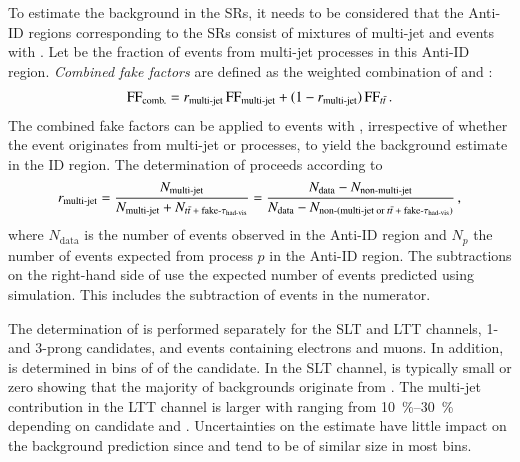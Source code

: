 To estimate the \faketauhadvis background in the SRs, it needs to be considered
that the Anti-ID regions corresponding to the SRs consist of mixtures of
multi-jet and \ttbar events with \faketauhadvis. Let \rqcd be the fraction of
\faketauhadvis events from multi-jet processes in this Anti-ID
region. \emph{Combined fake factors} are defined as the weighted combination of
\FFqcd and \FFttbar:
\begin{align*}
  \text{FF}_{\text{comb.}} = r_{\text{multi-jet}} \, \text{FF}_{\text{multi-jet}} + (1 - r_{\text{multi-jet}}) \, \text{FF}_{t\bar{t}} \,\text{.}
\end{align*}
The combined fake factors can be applied to events with \faketauhadvis,
irrespective of whether the event originates from multi-jet or \ttbar processes,
to yield the background estimate in the ID region. The determination of \rqcd
proceeds according to
\begin{align}
  \rqcd =
  \frac{N_{\text{multi-jet}}}{N_{\text{multi-jet}} + N_{\text{\ttbarFakes}}}
  = \frac
  { N_{\text{data}} - N_{\text{non-multi-jet}} }
  { N_{\text{data}} - N_{\text{non-(multi-jet or \ttbarFakes)}} } \,\text{,}
  \label{eq:rqcd}
\end{align}
where $N_{\text{data}}$ is the number of events observed in the Anti-ID region
and $N_{p}$ the number of events expected from process $p$ in the Anti-ID
region. The subtractions on the right-hand side of  use the
expected number of events predicted using simulation. This includes the
subtraction of \ttbarFakes events in the numerator.

The determination of \rqcd is performed separately for the \lephad SLT and LTT
channels, 1- and 3-prong \tauhadvis candidates, and events containing electrons
and muons. In addition, \rqcd is determined in bins of \pT of the \tauhadvis
candidate. In the SLT channel, \rqcd is typically small or zero showing that the
majority of \faketauhadvis backgrounds originate from \ttbar. The multi-jet
contribution in the LTT channel is larger with \rqcd ranging from
\SIrange{10}{30}{\percent} depending on \tauhadvis candidate \pT and
\Ntracks. Uncertainties on the \rqcd estimate have little impact on the
\faketauhadvis background prediction since \FFqcd and \FFttbar tend to be of
similar size in most bins.

